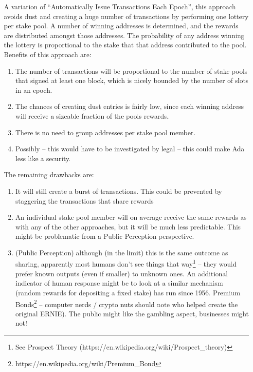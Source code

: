 \documentclass[11pt,a4paper]{article}
\begin{document}
A variation of ``Automatically Issue Transactions Each Epoch'', this
approach avoids dust and creating a huge number of transactions by
performing one lottery per stake pool. A number of winning addresses is
determined, and the rewards are distributed amongst those addresses. The
probability of any address winning the lottery is proportional to the
stake that that address contributed to the pool. Benefits of this
approach are:

\begin{enumerate}
\item
  The number of transactions will be proportional to the number of stake
  pools that signed at least one block, which is nicely bounded by the
  number of slots in an epoch.
\item
  The chances of creating dust entries is fairly low, since each winning
  address will receive a sizeable fraction of the pools rewards.
\item
  There is no need to group addresses per stake pool member.
\item
  Possibly -- this would have to be investigated by legal -- this could
  make Ada less like a security.
\end{enumerate}

The remaining drawbacks are:

\begin{enumerate}
\item
  It will still create a burst of transactions. This could be prevented
  by staggering the transactions that share rewards
\item
  An individual stake pool member will on average receive the same
  rewards as with any of the other approaches, but it will be much less
  predictable. This might be problematic from a Public Perception
  perspective.
\item
  (Public Perception) although (in the limit) this is the same outcome
  as sharing, apparently most humans don't see things that way\footnote{See
  Prospect Theory (https://en.wikipedia.org/wiki/Prospect\_theory)} --
  they would prefer known outputs (even if smaller) to unknown ones.
  An additional indicator of human response might be to look at a
  similar mechanism (random rewards for depositing a fixed stake) has
  run since 1956. Premium
  Bonds\footnote{https://en.wikipedia.org/wiki/Premium\_Bond} --
  computer nerds /
  crypto nuts should note who helped create the original ERNIE). The
  public might like the gambling aspect, businesses might not!
\end{enumerate}
\end{document}
